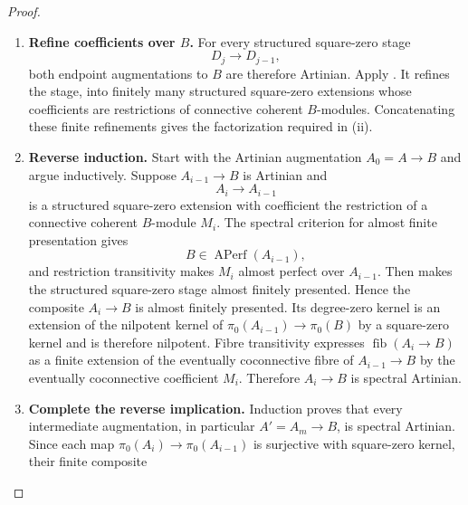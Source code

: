 \begin{proof}
\begin{enumerate}[label=\textup{(\arabic*)}]
    connective coherent \(A\)-modules. The forward implication in
    , applied stage by stage,
    shows that every \(D_j\to A\) is spectral Artinian. Since \(A\to B\) is
    Artinian, each composite
    \[
        D_j\longrightarrow A\longrightarrow B
    \]
    is Artinian as well: almost finite presentation is stable under composition,
    nilpotent degree-zero kernels are stable under composition, and the relative
    fibre of a composite is an extension of the two relative fibres.
    \item \textbf{Refine coefficients over \(B\).}
    For every structured square-zero stage
    \[
        D_j\longrightarrow D_{j-1},
    \]
    both endpoint augmentations to \(B\) are therefore Artinian. Apply
    . It refines the stage,
    into finitely many structured square-zero extensions
    whose coefficients are restrictions of connective coherent \(B\)-modules.
    Concatenating these finite refinements gives the factorization required in
    \textup{(ii)}.
    \item \textbf{Reverse induction.}
    Start with the Artinian augmentation \(A_0=A\to B\) and argue inductively.
    Suppose \(A_{i-1}\to B\) is Artinian and
    \[
        A_i\longrightarrow A_{i-1}
    \]
    is a structured square-zero extension with coefficient the restriction of a
    connective coherent \(B\)-module \(M_i\). The spectral criterion for almost finite presentation
    gives
    \[
        B\in\operatorname{APerf}(A_{i-1}),
    \]
    and restriction transitivity makes \(M_i\) almost perfect over \(A_{i-1}\).
    Then  makes the structured square-zero stage almost
    finitely presented. Hence the composite \(A_i\to B\) is almost finitely
    presented. Its degree-zero kernel is an extension of the nilpotent kernel of
    \(\pi_0(A_{i-1})\to\pi_0(B)\) by a square-zero kernel and is therefore
    nilpotent. Fibre transitivity expresses \(\operatorname{fib}(A_i\to B)\) as
    a finite extension of the eventually coconnective fibre of
    \(A_{i-1}\to B\) by the eventually coconnective coefficient \(M_i\).
    Therefore \(A_i\to B\) is spectral Artinian.
    \item \textbf{Complete the reverse implication.}
    Induction proves that every intermediate augmentation, in particular
    \(A'=A_m\to B\), is spectral Artinian. Since each map
    \(\pi_0(A_i)\to\pi_0(A_{i-1})\) is surjective with square-zero kernel, their
    finite composite
    \[
\]
\end{enumerate}
\end{proof}

